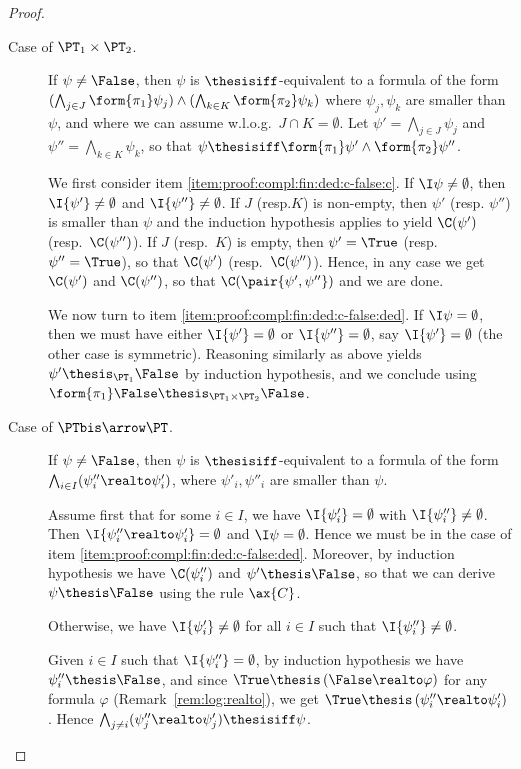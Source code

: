 \begin{proof}
\begin{description}
\item[Case of $\PT_1 \times \PT_2$.]
If $\psi \neq \False$,
%
then $\psi$ is $\thesisiff$-equivalent to a formula of the form
\( 
  (\bigwedge_{j \in J} \form{\pi_1}\psi_j)
  \land
  (\bigwedge_{k \in K} \form{\pi_2}\psi_k)
\)
where $\psi_j,\psi_k$ are smaller than $\psi$,
and
where we can assume w.l.o.g.\ $J \cap K = \emptyset$.
Let $\psi' = \bigwedge_{j \in J} \psi_j$
and $\psi'' = \bigwedge_{k \in K} \psi_k$,
so that $\psi \thesisiff \form{\pi_1}\psi' \land \form{\pi_2}\psi''$.

We first consider item \eqref{item:proof:compl:fin:ded:c-false:c}.
If $\I\psi \neq \emptyset$,
then $\I{\psi'} \neq \emptyset$
and $\I{\psi''} \neq \emptyset$.
If $J$ (resp.\@ $K$) is non-empty,
then $\psi'$ (resp. $\psi''$) is smaller than $\psi$
and the induction hypothesis applies to yield
$\C(\psi')$ (resp.\ $\C(\psi'')$).
If $J$ (resp.\ $K$) is empty, then
$\psi' = \True$ (resp.\ $\psi'' = \True$),
so that $\C(\psi')$ (resp.\ $\C(\psi'')$).
%
Hence, in any case we get $\C(\psi')$ and $\C(\psi'')$,
so that $\C(\pair{\psi',\psi''})$ and we are done.

We now turn to item \eqref{item:proof:compl:fin:ded:c-false:ded}.
If  $\I\psi = \emptyset$,
then we must have either $\I{\psi'} = \emptyset$
or $\I{\psi''} = \emptyset$,
say  $\I{\psi'} = \emptyset$ (the other case is symmetric).
Reasoning similarly as above
yields $\psi' \thesis_{\PT_1} \False$ by induction hypothesis,
and we conclude using
$\form{\pi_1}\False \thesis_{\PT_1 \times \PT_2} \False$.

\item[Case of $\PTbis \arrow \PT$.]
If $\psi \neq \False$,
then $\psi$ is $\thesisiff$-equivalent to a formula of the form
$\bigwedge_{i \in I} (\psi''_i \realto \psi'_i)$,
where $\psi'_i, \psi''_i$ are smaller than $\psi$.

Assume first that for some $i \in I$,
we have $\I{\psi'_i} = \emptyset$
with $\I{\psi''_i} \neq \emptyset$.
Then $\I{\psi''_i \realto \psi'_i} = \emptyset$
and $\I\psi = \emptyset$.
Hence we must be in the case of item \eqref{item:proof:compl:fin:ded:c-false:ded}.
Moreover, by induction hypothesis we have $\C(\psi''_i)$
and $\psi' \thesis \False$,
so that we can derive $\psi \thesis \False$ using the rule $\ax{C}$.

Otherwise, we have $\I{\psi'_i} \neq \emptyset$
for all $i \in I$ such that $\I{\psi''_i} \neq \emptyset$.

Given $i \in I$ such that $\I{\psi''_i} = \emptyset$,
by induction hypothesis we have $\psi''_i \thesis \False$,
and since $\True \thesis \left( \False \realto \varphi \right)$
for any formula $\varphi$ (Remark~\ref{rem:log:realto}),
we get $\True \thesis \left(\psi''_i \realto \psi'_i \right)$.
Hence
$\bigwedge_{j \neq i}(\psi''_j \realto \psi'_j) \thesisiff \psi$.



\end{description}
\end{proof}
